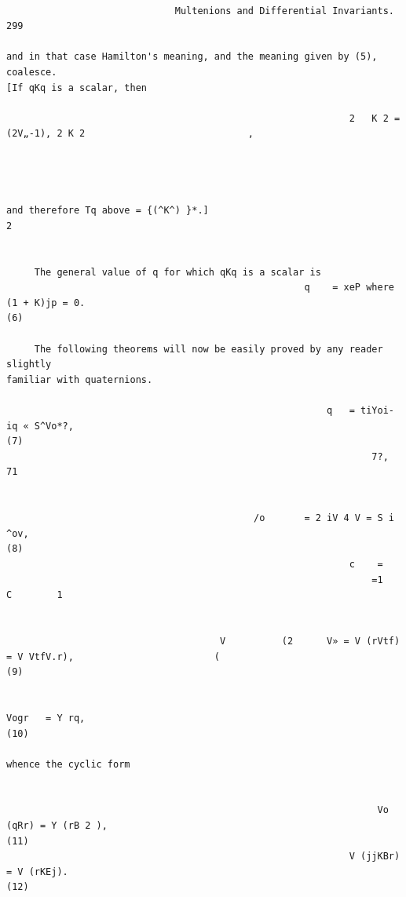 \documentclass[10pt]{article}
\begin{document}
\begin{verbatim}

                              Multenions and Differential Invariants.                                                                                                  299

and in that case Hamilton's meaning, and the meaning given by (5), coalesce.
[If qKq is a scalar, then

                                                             2   K 2 = (2V„-1), 2 K 2                             ,




and therefore Tq above = {(^K^) }*.]                                     2


     The general value of q for which qKq is a scalar is
                                                     q    = xeP where (1 + K)jp = 0.                                                                                     (6)

     The following theorems will now be easily proved by any reader slightly
familiar with quaternions.

                                                         q   = tiYoi-iq « S^Vo*?,                                                                                        (7)
                                                                 7?,                              71


                                            /o       = 2 iV 4 V = S i ^ov,                                                                                               (8)
                                                             c    =
                                                                 =1                           C        1


                                      V          (2      V» = V (rVtf) = V VtfV.r),                         (                                                            (9)

                                                                        Vogr   = Y rq,                                                                                  (10)

whence the cyclic form


                                                                  Vo (qRr) = Y (rB 2 ),                                                                                 (11)
                                                             V (jjKBr) = V (rKEj).                                                                                      (12)


\end{verbatim}
\end{document}
